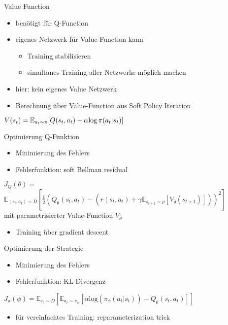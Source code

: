 \begin{frame}{Value Function}
\begin{itemize}
\item benötigt für Q-Function
\item eigenes Netzwerk für Value-Function kann
\begin{itemize}
\item Training stabilisieren
\item simultanes Training aller Netzwerke möglich machen \\[12pt]
\end{itemize}
\item hier: kein eigenes Value Netzwerk
\item Berechnung über Value-Function aus Soft Policy Iteration \\[6pt]
\end{itemize}
\center ${V}(s_{t}) = \mathbb{E}_{a_t \sim \pi}[\mathnormal{Q}(s_t, a_t) - \alpha \mathrm{log} \, \pi (a_t|s_t)]$
\end{frame}

\begin{frame}{Optimierung Q-Funktion}
\begin{itemize}
\item Minimierung des Fehlers
\item Fehlerfunktion: soft Bellman residual \\[12pt]
\end{itemize}
 $J_{Q}(\theta)=$
$\mathbb{E}_{(s_{t},a_{t})\sim D}\left[\frac{1}{2}(Q_{\theta}(s_{t},a_{t})-(r(s_{t},a_{t})+\gamma \mathbb{E}_{s_{t+1}\sim p}[V_{\overline{\theta}}(s_{t+1})]))^{2}\right]$ \\[12pt]

mit parametrisierter Value-Function $V_{\overline{\theta}}$ \\[12pt]

\begin{itemize}
\item Training über gradient descent
\end{itemize}
\end{frame}

\begin{frame}{Optimierung der Strategie}
\begin{itemize}
\item Minimierung des Fehlers
\item Fehlerfunktion: KL-Divergenz \\[12pt]
\end{itemize}
$J_{\pi}(\phi)=\mathbb{E}_{s_{t}\sim D}\left[\mathbb{E}_{a_{t}\sim \pi_{\phi}}\left[\alpha \mathrm{log}(\pi_{\phi}(a_{t}|s_{t}))-Q_{\theta}(s_{t},a_{t})\right]\right]$ \\[12pt]
\begin{itemize}
\item für vereinfachtes Training: reparameterization trick
\end{itemize}
\end{frame}

